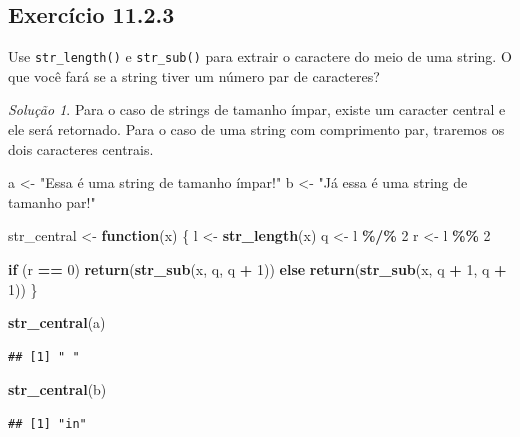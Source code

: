 \documentclass[
]{latex/krantz}
\newenvironment{Shaded}{\begin{snugshade}}{\end{snugshade}}
\newcommand{\ControlFlowTok}[1]{\textcolor[rgb]{0.13,0.29,0.53}{\textbf{#1}}}
\newcommand{\DecValTok}[1]{\textcolor[rgb]{0.00,0.00,0.81}{#1}}
\newcommand{\FunctionTok}[1]{\textcolor[rgb]{0.13,0.29,0.53}{\textbf{#1}}}
\newcommand{\NormalTok}[1]{#1}
\newcommand{\OtherTok}[1]{\textcolor[rgb]{0.56,0.35,0.01}{#1}}
\newcommand{\SpecialCharTok}[1]{\textcolor[rgb]{0.81,0.36,0.00}{\textbf{#1}}}
\newcommand{\StringTok}[1]{\textcolor[rgb]{0.31,0.60,0.02}{#1}}
\theoremstyle{definition}
\theoremstyle{definition}
\theoremstyle{definition}
\theoremstyle{definition}
\theoremstyle{remark}
\newtheorem*{solution}{Solução}
\begin{document}
\hypertarget{exr11-2-3}{%
\subsection*{Exercício 11.2.3}\label{exr11-2-3}}

Use \texttt{str\_length()} e \texttt{str\_sub()} para extrair o caractere do meio de uma string. O que você fará se a string tiver um número par de caracteres?

\begin{solution}

Para o caso de strings de tamanho ímpar, existe um caracter central e ele será retornado.
Para o caso de uma string com comprimento par, traremos os dois caracteres centrais.

\begin{Shaded}
\begin{Highlighting}[]
\NormalTok{a }\OtherTok{\textless{}{-}} \StringTok{"Essa é uma string de tamanho ímpar!"}
\NormalTok{b }\OtherTok{\textless{}{-}} \StringTok{"Já essa é uma string de tamanho par!"}

\NormalTok{str\_central }\OtherTok{\textless{}{-}} \ControlFlowTok{function}\NormalTok{(x) \{}
\NormalTok{  l }\OtherTok{\textless{}{-}} \FunctionTok{str\_length}\NormalTok{(x)}
\NormalTok{  q }\OtherTok{\textless{}{-}}\NormalTok{ l }\SpecialCharTok{\%/\%} \DecValTok{2}
\NormalTok{  r }\OtherTok{\textless{}{-}}\NormalTok{ l }\SpecialCharTok{\%\%} \DecValTok{2}
  
  \ControlFlowTok{if}\NormalTok{ (r }\SpecialCharTok{==} \DecValTok{0}\NormalTok{)}
    \FunctionTok{return}\NormalTok{(}\FunctionTok{str\_sub}\NormalTok{(x, q, q }\SpecialCharTok{+} \DecValTok{1}\NormalTok{))}
  \ControlFlowTok{else}
    \FunctionTok{return}\NormalTok{(}\FunctionTok{str\_sub}\NormalTok{(x, q }\SpecialCharTok{+} \DecValTok{1}\NormalTok{, q }\SpecialCharTok{+} \DecValTok{1}\NormalTok{))}
\NormalTok{\}}

\FunctionTok{str\_central}\NormalTok{(a)}
\end{Highlighting}
\end{Shaded}

\begin{verbatim}
## [1] " "
\end{verbatim}

\begin{Shaded}
\begin{Highlighting}[]
\FunctionTok{str\_central}\NormalTok{(b)}
\end{Highlighting}
\end{Shaded}

\begin{verbatim}
## [1] "in"
\end{verbatim}

\end{solution}
\end{document}
